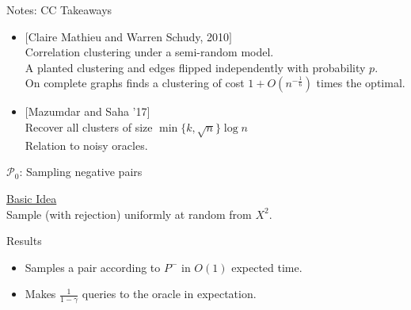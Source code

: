 \documentclass{beamer}
\newcommand{\mc}{\mathcal}
\begin{document}
\begin{frame}[label=notesCCTakeaways]{Notes: CC Takeaways}
	\begin{itemize}
	\item $[$Claire Mathieu and Warren Schudy, 2010$]$ \\
	Correlation clustering under a semi-random model. \\
	A planted clustering and edges flipped independently with probability $p$. \\
	On complete graphs finds a clustering of cost $1+O(n^{-\frac{1}{6}})$ times the optimal. 
	\item $[$Mazumdar and Saha '17$]$\\
	Recover all clusters of size $\min\{k, \sqrt n\}\log n$\\
	Relation to noisy oracles.
	\end{itemize}
\end{frame}

\begin{frame}[label=detailsRCCNegative]{$\mc P_0$: Sampling negative pairs}
	
	\vspace{10pt}\textcolor{blue}{\hyperlink{RCCPositive}{Basic Idea}}\\
	Sample (with rejection) uniformly at random from $X^2$. 
	
	\vspace{20pt}\begin{block}{Results}
		\begin{itemize}
			\vspace{5pt}\item Samples a pair according to $P^-$ in $O(1)$ expected time.
			\vspace{10pt}\item Makes $\frac{1}{1-\gamma}$ queries to the oracle in expectation. 
		\end{itemize}			
	\end{block}
	
	
\end{frame}
\end{document}
